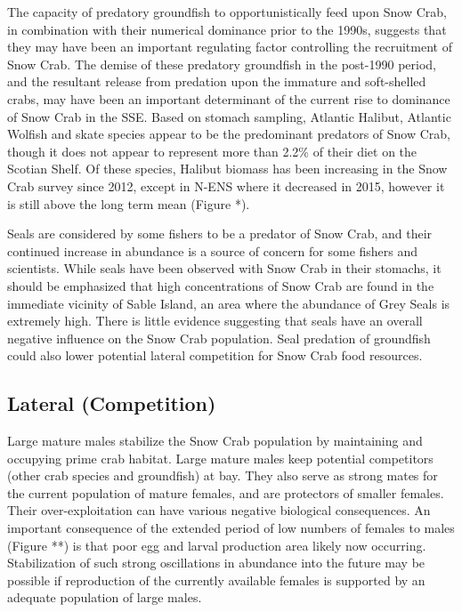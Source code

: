 \documentclass[paper=a4, fontsize=11pt]{article}
\begin{document}
The capacity of predatory groundfish to opportunistically feed upon Snow Crab, in combination with their numerical dominance prior to the 1990s, suggests that they may have been an important regulating factor controlling the recruitment of Snow Crab. The demise of these predatory groundfish in the post-1990 period, and the resultant release from predation upon the immature and soft-shelled crabs, may have been an important determinant of the current rise to dominance of Snow Crab in the SSE. Based on stomach sampling, Atlantic Halibut, Atlantic Wolfish and skate species appear to be the predominant predators of Snow Crab, though it does not appear to represent more than 2.2\% of their diet on the Scotian Shelf. Of these species, Halibut biomass has been increasing in the Snow Crab survey since 2012, except in N-ENS where it decreased in 2015, however it is still above the long term mean (Figure *). 

Seals are considered by some fishers to be a predator of Snow Crab, and their continued increase in abundance is a source of concern for some fishers and scientists. While seals have been observed with Snow Crab in their stomachs, it should be emphasized that high concentrations of Snow Crab are found in the immediate vicinity of Sable Island, an area where the abundance of Grey Seals is extremely high. There is little evidence suggesting that seals have an overall negative influence on the Snow Crab population. Seal predation of groundfish could also lower potential lateral competition for Snow Crab food resources. 

\subsection{Lateral (Competition)}

Large mature males stabilize the Snow Crab population by maintaining and occupying prime crab habitat. Large mature males keep potential competitors (other crab species and groundfish) at bay. They also serve as strong mates for the current population of mature females, and are protectors of smaller females. Their over-exploitation can have various negative biological consequences. An important consequence of the extended period of low numbers of females to males (Figure **) is that poor egg and larval production area likely now occurring. Stabilization of such strong oscillations in abundance into the future may be possible if reproduction of the currently available females is supported by an adequate population of large males. 
\end{document}
